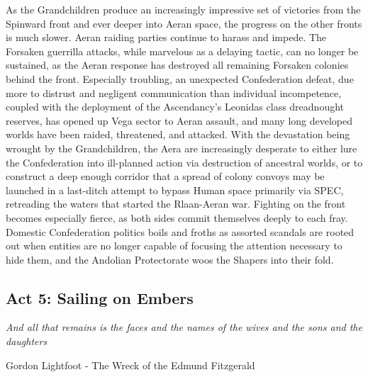 As the Grandchildren produce an increasingly impressive set of
victories from the Spinward front and ever deeper into Aeran space,
the progress on the other fronts is much slower. Aeran raiding parties
continue to harass and impede. The Forsaken guerrilla attacks, while
marvelous as a delaying tactic, can no longer be sustained, as the
Aeran response has destroyed all remaining Forsaken colonies behind
the front. Especially troubling, an unexpected Confederation defeat,
due more to distrust and negligent communication than individual
incompetence, coupled with the deployment of the Ascendancy's Leonidas
class dreadnought reserves, has opened up Vega sector to Aeran
assault, and many long developed worlds have been raided, threatened,
and attacked. With the devastation being wrought by the Grandchildren,
the Aera are increasingly desperate to either lure the Confederation
into ill-planned action via destruction of ancestral worlds, or to
construct a deep enough corridor that a spread of colony convoys may
be launched in a last-ditch attempt to bypass Human space primarily
via SPEC, retreading the waters that started the Rlaan-Aeran
war. Fighting on the front becomes especially fierce, as both sides
commit themselves deeply to each fray. Domestic Confederation politics
boils and froths as assorted scandals are rooted out when entities are
no longer capable of focusing the attention necessary to hide them,
and the Andolian Protectorate woos the Shapers into their fold.

\subsection{Act 5: Sailing on Embers}

\begin{center}
{\it And all that remains is the faces and the names of the wives and the sons and the daughters}
	
Gordon Lightfoot - The Wreck of the Edmund Fitzgerald
\end{center}

